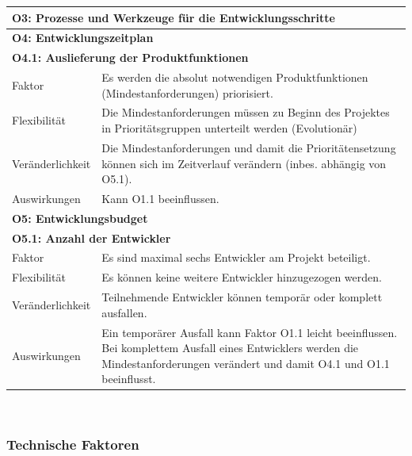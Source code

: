 \documentclass[fontsize=12pt,paper=a4,twoside]{scrartcl}
\begin{document}
\newpage

\begin{tabularx}{\textwidth}{|l|X|}
\hline
\multicolumn{2}{|l|}{\textbf{O3: Prozesse und Werkzeuge für die Entwicklungsschritte}}\\\hline

\multicolumn{2}{|l|}{\textbf{O4: Entwicklungszeitplan}}\\\hline
\multicolumn{2}{|l|}{\textbf{O4.1: Auslieferung der Produktfunktionen}}\\\hline
 Faktor & Es werden die absolut notwendigen Produktfunktionen (Mindestanforderungen) priorisiert. \\\hline
 Flexibilität & Die Mindestanforderungen müssen zu Beginn des Projektes in Prioritätsgruppen unterteilt werden (Evolutionär) \\\hline
 Veränderlichkeit &  Die Mindestanforderungen und damit die Prioritätensetzung können sich im Zeitverlauf verändern (inbes. abhängig von O5.1). \\\hline
 Auswirkungen & Kann O1.1 beeinflussen.\\\hline
\multicolumn{2}{|l|}{\textbf{O5: Entwicklungsbudget}}\\\hline
\multicolumn{2}{|l|}{\textbf{O5.1: Anzahl der Entwickler}}\\\hline
 Faktor & Es sind maximal sechs Entwickler am Projekt beteiligt. \\\hline
 Flexibilität & Es können keine weitere Entwickler hinzugezogen werden.  \\\hline
 Veränderlichkeit & Teilnehmende Entwickler können temporär oder komplett ausfallen.\\\hline
 Auswirkungen & Ein temporärer Ausfall kann Faktor O1.1 leicht beeinflussen. Bei komplettem Ausfall eines Entwicklers werden die Mindestanforderungen verändert und damit O4.1 und O1.1 beeinflusst.\\\hline
\end{tabularx}\\
\clearpage

\subsubsection{Technische Faktoren}
\end{document}
